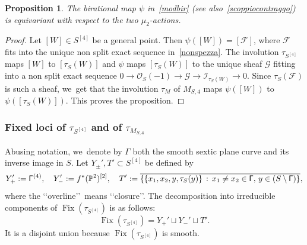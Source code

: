 \documentclass[11pt]{article}
\newcommand\cF{\mathcal{F}}
\newcommand\cG{\mathcal{G}}
\newcommand\cI{\mathcal{I}}
\newcommand\cO{\mathcal{O}}
\DeclareMathOperator{\Fix}{Fix}
\let\ov\overline
\newtheorem{prop}[lemm]{Proposition}
\theoremstyle{definition}
\begin{document}
\begin{prop}\label{prop:azionicompat}
The birational map $\psi$ in~\eqref{modbir} (see also~\eqref{scoppiocontraggo}) is equivariant with respect to the two $\mu_2$-actions.
\end{prop}

\begin{proof}
Let $[W]\in S^{[4]}$ be a general point. Then $\psi([W])=[\cF]$, where $\cF$ fits into the unique non split exact sequence in~\eqref{nonspezza}. The involution $\tau_{S^{[4]}}$ maps $[W]$ to $[\tau_S(W)]$ and $\psi$ maps $[\tau_S(W)]$ to the unique sheaf $\cG$ fitting into a non split exact sequence $0\to\cO_S(-1)\to\cG\to \cI_{\tau_S(W)}\to 0$. Since $\tau_S(\cF)$ is such a sheaf, we~get that the involution $\tau_M$ of $M_{S,4}$ maps $\psi([W])$ to $\psi([\tau_S(W)])$. This proves the proposition.
\end{proof}

\subsubsection*{Fixed loci of $\tau_{S^{[4]}}$ and of $\tau_{M_{S,4}}$}

Abusing notation, we~denote by $\mathsf{\Gamma}$ both the smooth sextic plane curve and its inverse image in $S$.
Let $Y_{\pm}',T'\subset S^{[4]}$ be defined by
\begin{equation*}
Y_+':=\mathsf{\Gamma}^{(4)},\quad Y_-':=f^*(\P^2)^{[2]},\quad
T':=\ov{\{\{x_1,x_2,y,\tau_S(y)\} \,:\, x_1\not= x_2\in
\mathsf{\Gamma},\, y\in(S\setminus\mathsf{\Gamma})\}},
\end{equation*}
where the \lq\lq overline\rq\rq\ means \lq\lq closure\rq\rq.
The decomposition into irreducible components of $\Fix(\tau_{S^{[4]}})$ is as follows:
\begin{equation*}
\Fix(\tau_{S^{[4]}})=Y_+'\sqcup Y_-'\sqcup T'.
\end{equation*}
It is a disjoint union because $\Fix(\tau_{S^{[4]}})$ is smooth.
\end{document}
